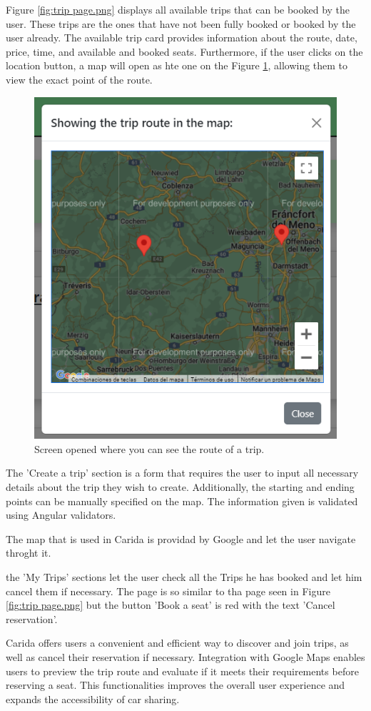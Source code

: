 \documentclass{article}
\begin{document}
    Figure \ref{fig:trip page.png} displays all available trips that can be booked by the user. These trips are the ones that have not been fully booked or booked by the user already. The available trip card provides information about the route, date, price, time, and available and booked seats. Furthermore, if the user clicks on the location button, a map will open as hte one on the Figure \ref{fig:map of route.png}, allowing them to view the exact point of the route.

    \begin{figure}[h]
      \centering
      \includegraphics[width=0.5\columnwidth]{figures/Map of route.png}
      \caption{Screen opened where you can see the route of a trip.\label{fig:map of route.png}}
      \end{figure}

    The 'Create a trip' section is a form that requires the user to input all necessary details about the trip they wish to create. Additionally, the starting and ending points can be manually specified on the map. The information given is validated using Angular validators.

    The map that is used in Carida is providad by Google and let the user navigate throght it.

    the 'My Trips' sections let the user check all the Trips he has booked and let him cancel them if necessary. The page is so similar to tha page seen in Figure \ref{fig:trip page.png} but the button 'Book a seat' is red with the text 'Cancel reservation'.
    
    Carida offers users a convenient and efficient way to discover and join trips, as well as cancel their reservation if necessary. Integration with Google Maps enables users to preview the trip route and evaluate if it meets their requirements before reserving a seat. This functionalities improves the overall user experience and expands the accessibility of car sharing.
\end{document}
